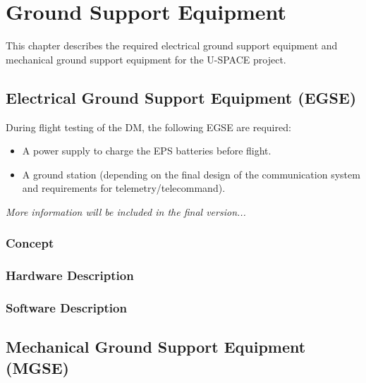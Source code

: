 \chapter{Ground Support Equipment}
\label{chap:ground_support}

This chapter describes the required electrical ground support equipment and mechanical ground support equipment for the \ac{U-SPACE} project. 

\section{Electrical Ground Support Equipment (EGSE)}

During flight testing of the \ac{DM}, the following \ac{EGSE} are required: 

\begin{itemize}
\item A power supply to charge the \ac{EPS} batteries before flight.
\item A ground station (depending on the final design of the communication system and requirements for telemetry/telecommand).
\end{itemize}

\textit{More information will be included in the final version...}

\subsection{Concept}

\subsection{Hardware Description}


\subsection{Software Description}


\section{Mechanical Ground Support Equipment (MGSE)}

